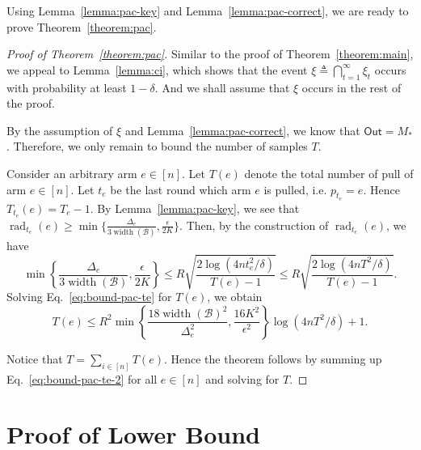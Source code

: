 \documentclass{article}
\newcommand{\B}{\mathcal B}
\DeclareMathOperator{\rank}{width}
\DeclareMathOperator{\rad}{rad}
\newcommand{\out}{\mathsf{Out}}
\begin{document}
Using Lemma~\ref{lemma:pac-key} and Lemma~\ref{lemma:pac-correct}, we are ready to prove Theorem~\ref{theorem:pac}.
\begin{proof}[Proof of Theorem~\ref{theorem:pac}]
Similar to the proof of Theorem~\ref{theorem:main}, we appeal to Lemma~\ref{lemma:ci}, which shows that the event $\xi \triangleq \bigcap_{t=1}^\infty \xi_t$ occurs with probability at least $1-\delta$.
And we shall assume that $\xi$ occurs in the rest of the proof.

By the assumption of $\xi$ and Lemma~\ref{lemma:pac-correct}, we know that $\out=M_*$. Therefore, we only remain to bound the number of samples $T$.

Consider an arbitrary arm $e\in [n]$.
Let $T(e)$ denote the total number of pull of arm $e\in [n]$.
Let $t_e$ be the last round which arm $e$ is pulled, i.e. $p_{t_e} = e$. 
Hence $T_{t_e}(e) = T_e - 1$.
By Lemma~\ref{lemma:pac-key}, we see that 
$\rad_{t_e}(e) \ge \min\{\frac{\Delta_e}{3\rank(\B)},\frac{\epsilon}{2K}\}$.
Then, by the construction of $\rad_{t_e}(e)$, we have
\begin{equation}
\min\left\{\frac{\Delta_e}{3\rank(\B)},\frac{\epsilon}{2K}\right\} \le 
R\sqrt{\frac{2\log\left(4n t_e^2/\delta\right)}{T(e)-1}} \le
R\sqrt{\frac{2\log\left(4n T^2/\delta\right)}{T(e)-1}}.
\label{eq:bound-pac-te}
\end{equation}
Solving Eq.~\eqref{eq:bound-pac-te} for $T(e)$, we obtain
\begin{equation}
\label{eq:bound-pac-te-2}
T(e) \le R^2\min\left\{\frac{18 \rank(\B)^2}{\Delta_e^2},\frac{16K^2}{\epsilon^2}\right\} \log(4nT^2/\delta)+1.
\end{equation}

Notice that $T=\sum_{i\in[n]} T(e)$. 
Hence the theorem follows by summing up Eq.~\eqref{eq:bound-pac-te-2} for all $e\in [n]$ and solving for $T$.
\end{proof}



\section{Proof of Lower Bound}
\lowerbound*
\end{document}

